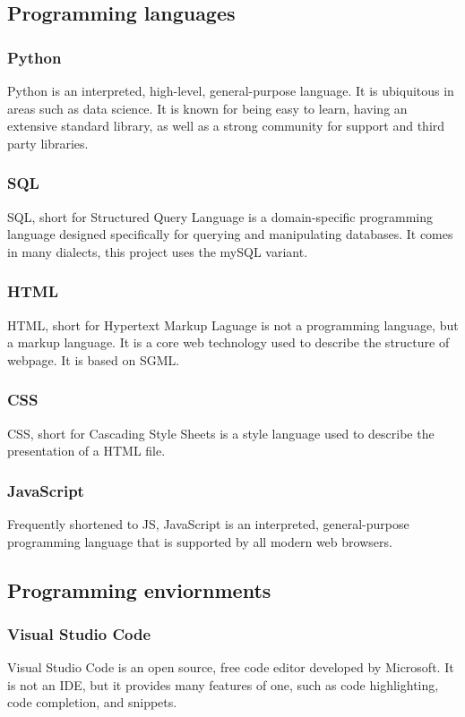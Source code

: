     \subsection{Programming languages}
        \subsubsection{Python}
        Python is an interpreted, high-level, general-purpose language. It is ubiquitous in areas such as data science. It is known for being easy to learn, having an extensive standard library, as well as a strong community for support and third party libraries.
        \subsubsection{SQL}
        SQL, short for Structured Query Language is a domain-specific programming language designed specifically for querying and manipulating databases. It comes in many dialects, this project uses the mySQL variant.
        \subsubsection{HTML} 
        HTML, short for Hypertext Markup Laguage is not a programming language, but a markup language. It is a core web technology used to describe the structure of webpage. It is based on SGML.
        \subsubsection{CSS}
        CSS, short for Cascading Style Sheets is a style language used to describe the presentation of a HTML file.
        \subsubsection{JavaScript}
        Frequently shortened to JS, JavaScript is an interpreted, general-purpose programming language that is supported by all modern web browsers.
    \subsection{Programming enviornments}
        \subsubsection{Visual Studio Code}
        Visual Studio Code is an open source, free code editor developed by Microsoft. It is not an IDE, but it provides many features of one, such as code highlighting, code completion, and snippets.
